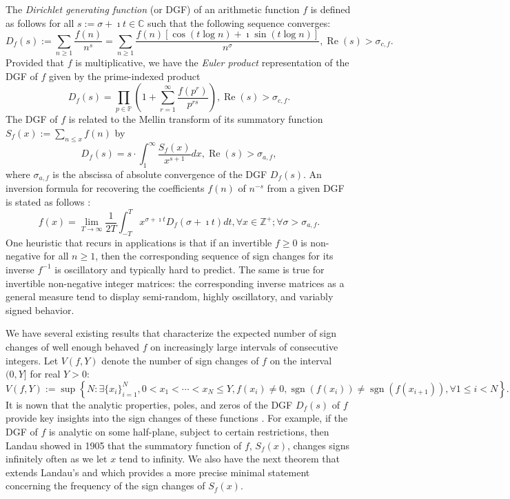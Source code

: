 \documentclass[11pt,reqno]{amsart}
\numberwithin{figure}{section}
\numberwithin{table}{section}
\DeclareMathOperator{\sgn}{sgn}
\renewcommand{\Re}{\operatorname{Re}}
\theoremstyle{plain}
\numberwithin{theorem}{section}
\theoremstyle{definition}
\begin{document}
The \emph{Dirichlet generating function} (or DGF) of 
an arithmetic function $f$ is defined as follows for all 
$s := \sigma+\imath t \in \mathbb{C}$ such that the 
following sequence converges: 
\[
D_f(s) := \sum_{n \geq 1} \frac{f(n)}{n^s} = 
     \sum_{n \geq 1} \frac{f(n) \left[\cos(t \log n) + \imath \sin(t \log n)\right]}{n^{\sigma}}, 
     \Re(s) > \sigma_{c,f}. 
\]
Provided that $f$ is multiplicative, we have the \emph{Euler product} representation of the DGF 
of $f$ given by the prime-indexed product
\[
D_f(s) = \prod_{p \in \mathbb{P}} \left(1 + \sum_{r=1}^{\infty} \frac{f(p^r)}{p^{rs}}\right), 
     \Re(s) > \sigma_{c,f}. 
\]
The DGF of $f$ is related to the Mellin transform of its summatory function 
$S_f(x) := \sum_{n \leq x} f(n)$ by 
\[
D_f(s) = s \cdot \int_1^{\infty} \frac{S_f(x)}{x^{s+1}} dx, \Re(s) > \sigma_{a,f}, 
\]
where $\sigma_{a,f}$ is the abscissa of absolute convergence of the DGF $D_f(s)$. 
An inversion formula for recovering the coefficients $f(n)$ of $n^{-s}$ 
from a given DGF is stated as follows \cite[\S 11.11]{APOSTOL-ANUMT}: 
\[
f(x) = \lim_{T \rightarrow \infty} \frac{1}{2T} \int_{-T}^{T} x^{\sigma+\imath t} 
     D_f(\sigma + \imath t) dt, \forall x \in \mathbb{Z}^{+}; 
     \forall \sigma > \sigma_{a,f}. 
\]
One heuristic that recurs in applications is that if an 
invertible $f \geq 0$ is non-negative for all $n \geq 1$, then the corresponding 
sequence of sign changes for its inverse $f^{-1}$ is oscillatory and typically 
hard to predict. The same is true for invertible non-negative integer matrices: 
the corresponding inverse matrices as a general measure tend to display 
semi-random, highly oscillatory, and variably signed behavior. 
\nocite{DIRINVFUNC-GROWTH-PROPS}

We have several existing results that characterize the expected number of sign changes of 
well enough behaved $f$ on increasingly large intervals of consecutive integers. 
Let $V(f, Y)$ denote the number of sign changes of $f$ on the interval $(0, Y]$ for 
real $Y > 0$: 
\[
V(f, Y) := \sup \left\{N: \exists \{x_i\}_{i=1}^N, 0<x_1<\cdots<x_N \leq Y, 
     f(x_i) \neq 0, \sgn(f(x_i)) \neq \sgn(f(x_{i+1})), \forall 1 \leq i < N\right\}. 
\]
It is nown that the analytic properties, poles, and zeros of the 
DGF $D_f(s)$ of $f$ provide key insights into the 
sign changes of these functions \cite{OSCPROPS-ARITHFUNCSI}. 
For example, if the DGF of $f$ is analytic on some half-plane, subject to certain 
restrictions, then Landau showed in 1905 that 
the summatory function of $f$, $S_f(x)$, changes signs infinitely often as we let 
$x$ tend to infinity. We also have the next 
theorem that extends Landau's and which provides a more precise minimal 
statement concerning the frequency of the sign changes of $S_f(x)$. 
\end{document}

